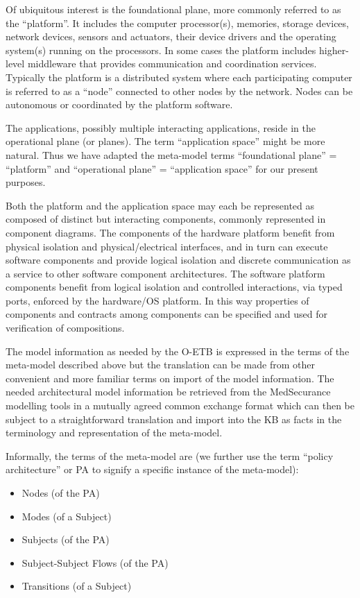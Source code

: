 \documentclass[12pt,twoside,a4paper]{article}
\begin{document}
Of ubiquitous interest is the foundational plane, more commonly referred to as the ``platform''. It includes the computer processor(s), memories, storage devices, network devices, sensors and actuators, their device drivers and the operating system(s) running on the processors. In some cases the platform includes higher-level middleware that provides communication and coordination services. Typically the platform is a distributed system where each participating computer is referred to as a ``node'' connected to other nodes by the network. Nodes can be autonomous or coordinated by the platform software.

The applications, possibly multiple interacting applications, reside in the operational plane (or planes). The term ``application space'' might be more natural. Thus we have adapted the meta-model terms ``foundational plane'' = ``platform'' and ``operational plane'' = ``application space'' for our present purposes.

Both the platform and the application space may each be represented as composed of distinct but interacting components, commonly represented in component diagrams. The components of the hardware platform benefit from physical isolation and physical/electrical interfaces, and in turn can execute software components and provide logical isolation and discrete communication as a service to other software component architectures. The software platform components benefit from logical isolation and controlled interactions, via typed ports, enforced by the hardware/OS platform. In this way properties of components and contracts among components can be specified and used for verification of compositions.

The model information as needed by the O-ETB is expressed in the terms of the meta-model described above but the translation can be made from other convenient and more familiar terms on import of the model information. The needed architectural model information be retrieved from the MedSecurance modelling tools in a mutually agreed common exchange format which can then be subject to a straightforward translation and import into the KB as facts in the terminology and representation of the meta-model.

Informally, the terms of the meta-model are (we further use the term ``policy architecture'' or PA to signify a specific instance of the meta-model):

\begin{itemize}
\item
  Nodes (of the PA)
\item
  Modes (of a Subject)
\item
  Subjects (of the PA)
\item
  Subject-Subject Flows (of the PA)
\item
  Transitions (of a Subject)
\end{itemize}
\end{document}
